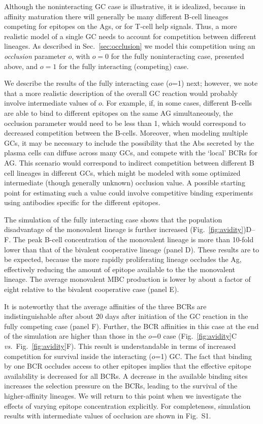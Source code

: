 \documentclass[utf8]{frontiersHLTH}%
\newcommand{\vo}[1]{#1} %
\def\vs {{\it vs.}}
\newcommand{\fig}[1]{Fig.~\ref{fig:#1}}
\newcommand{\Sec}[1]{Sec.~\ref{sec:#1}}
\renewcommand{\sec}[1]{\Sec{#1}}
\newcommand{\occl}{o}
\begin{document}
Although the noninteracting GC case is illustrative, it is idealized, because
in affinity maturation there will generally be many different B-cell
lineages competing for epitopes on the Ags, or for T-cell help
signals. Thus, a more realistic model of a single GC needs to account for
competition between different lineages. As described in \sec{occlusion} we
model this competition using an \textit{occlusion} parameter $\occl$, with $\occl=0$
for the fully noninteracting case, presented above, and $\occl=1$ for the fully interacting
(competing) case.

We describe the results of the fully interacting case ($\occl$=1) next; however, 
we note that a more realistic description of the overall GC reaction would probably
involve intermediate values of $o$. For example,
if, in some cases, different B-cells are able to bind to different epitopes
on the same AG simultaneously, the occlusion parameter would need to be less than 1, which would
correspond to decreased competition between the B-cells. Moreover, when modeling
multiple GCs, it may be necessary to include the possibility that the Abs secreted by the plasma cells
can diffuse across many GCs, and compete with the `local' BCRs for
AG.\cite{zhang13} This scenario would correspond to indirect
competition between different B cell lineages in different GCs, which might
be modeled with some optimized intermediate (though generally unknown) occlusion value.
\vo{A possible starting point for estimating such a value
could involve competitive binding experiments using antibodies specific for
the different epitopes.} 

The simulation of the fully interacting case shows that the
population disadvantage of the monovalent lineage is further increased
(\fig{avidity})D--F. The peak B-cell concentration of the monovalent lineage is more
than 10-fold lower than that of the bivalent cooperative lineage (panel D). These
results are to be expected, because the more rapidly proliferating lineage
occludes the Ag, effectively reducing the amount of epitope available to the
the monovalent lineage. The average monovalent MBC production is lower
by about a factor of \vo{eight} relative to the bivalent cooperative case (panel E).

It is noteworthy that the average affinities of the three BCRs are
indistinguishable after about 20 days after initiation of the GC reaction
in the fully competing case (panel F). Further, the BCR affinities in this
case at the end of the
simulation are higher than those in the $\occl$=0 case (\fig{avidity}C
\vs~\fig{avidity}F). This result is understandable in terms of increased
competition for survival inside the interacting ($\occl$=1) GC.  The fact
that binding by one BCR occludes access to other epitopes implies that
the effective epitope availability is decreased for all BCRs. 
A decrease in the available binding sites increases the
selection pressure on the BCRs, leading to the survival of the higher-affinity
lineages. We will return to this point when we investigate
the effects of varying epitope concentration explicitly. 
For completeness, simulation
results with intermediate values of occlusion are shown in Fig.~S1.
\end{document}
